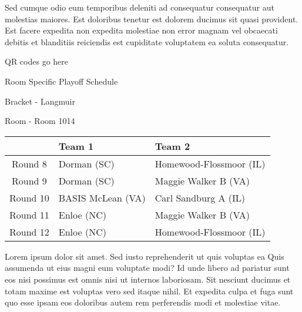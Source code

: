 \documentclass{article}%
\begin{document}
\newline%
Sed cumque odio eum temporibus deleniti ad consequatur consequatur aut molestias maiores. Est doloribus tenetur est dolorem ducimus sit quasi provident. Est facere expedita non expedita molestiae non error magnam vel obcaecati debitis et blanditiis reiciendis est cupiditate voluptatem ea soluta consequatur.%
\vspace*{140pt}%
\begin{center}%
\begin{Huge}%
QR codes go here%
\end{Huge}%
\end{center}%
\newpage%
\begin{center}%
\begin{Huge}%
Room Specific Playoff Schedule%
\end{Huge}%
\vspace*{8pt}%
\linebreak%
\begin{Large}%
Bracket {-} Langmuir%
\end{Large}%
\vspace*{8pt}%
\linebreak%
\vspace*{8pt}%
\begin{Large}%
Room {-} Room 1014%
\end{Large}%
\end{center}%
%
\begin{tabularx}{\textwidth}{|c|Y|Y|}%
\hline%
&Team 1&Team 2\\%
\hline%
Round 8&Dorman (SC)&Homewood{-}Flossmoor (IL)\\%
Round 9&Dorman (SC)&Maggie Walker B (VA)\\%
Round 10&BASIS McLean (VA)&Carl Sandburg A (IL)\\%
Round 11&Enloe (NC)&Maggie Walker B (VA)\\%
Round 12&Enloe (NC)&Homewood{-}Flossmoor (IL)\\%
\hline%
\end{tabularx}%
\vspace*{8pt}%
\newline%
Lorem ipsum dolor sit amet. Sed iusto reprehenderit ut quis voluptas ea Quis assumenda ut eius magni eum voluptate modi? Id unde libero ad pariatur sunt eos nisi possimus est omnis nisi ut internos laboriosam. Sit nesciunt ducimus et totam maxime est voluptas vero sed itaque nihil. Et expedita culpa et fuga sunt quo esse ipsam eos doloribus autem rem perferendis modi et molestiae vitae.\newline%
\end{document}
